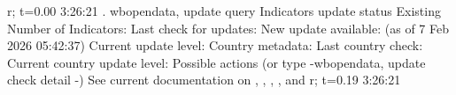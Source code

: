 r; t=0.00 3:26:21
{\smallskip}
. wbopendata, update query
{\smallskip}
{\smallskip}
Indicators update status
{\smallskip}
   Existing Number of Indicators: {}
   Last check for updates:        {}
   New update available:          {}      (as of 7 Feb 2026 05:42:37)
   Current update level:          {}
{\smallskip}
   Country metadata:               {}
   Last country check:             {}
   Current country update level:   {}
{\smallskip}
Possible actions
{\smallskip}
  {}   (or type -wbopendata, update check detail -)
{\smallskip}
   See current documentation on {}, {}, 
   {}, {}, and {}
{\smallskip}
r; t=0.19 3:26:21
